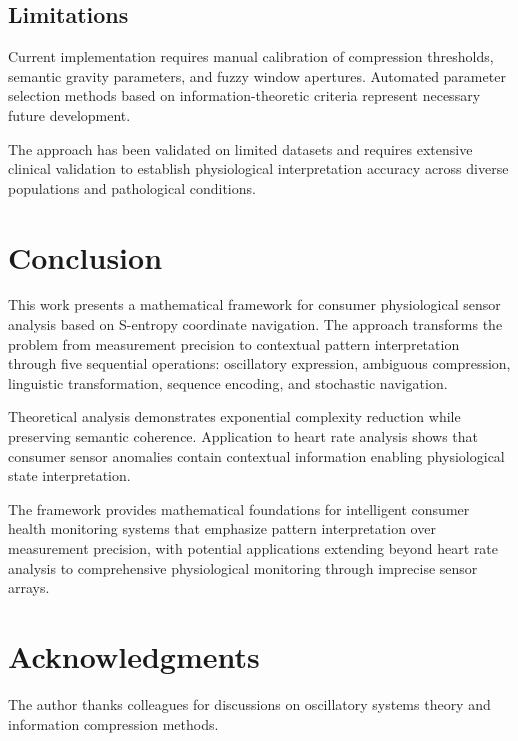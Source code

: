 \documentclass[12pt,a4paper]{article}
\begin{document}
\subsection{Limitations}

Current implementation requires manual calibration of compression thresholds, semantic gravity parameters, and fuzzy window apertures. Automated parameter selection methods based on information-theoretic criteria represent necessary future development.

The approach has been validated on limited datasets and requires extensive clinical validation to establish physiological interpretation accuracy across diverse populations and pathological conditions.

\section{Conclusion}

This work presents a mathematical framework for consumer physiological sensor analysis based on S-entropy coordinate navigation. The approach transforms the problem from measurement precision to contextual pattern interpretation through five sequential operations: oscillatory expression, ambiguous compression, linguistic transformation, sequence encoding, and stochastic navigation.

Theoretical analysis demonstrates exponential complexity reduction while preserving semantic coherence. Application to heart rate analysis shows that consumer sensor anomalies contain contextual information enabling physiological state interpretation.

The framework provides mathematical foundations for intelligent consumer health monitoring systems that emphasize pattern interpretation over measurement precision, with potential applications extending beyond heart rate analysis to comprehensive physiological monitoring through imprecise sensor arrays.

\section*{Acknowledgments}

The author thanks colleagues for discussions on oscillatory systems theory and information compression methods.
\end{document}
